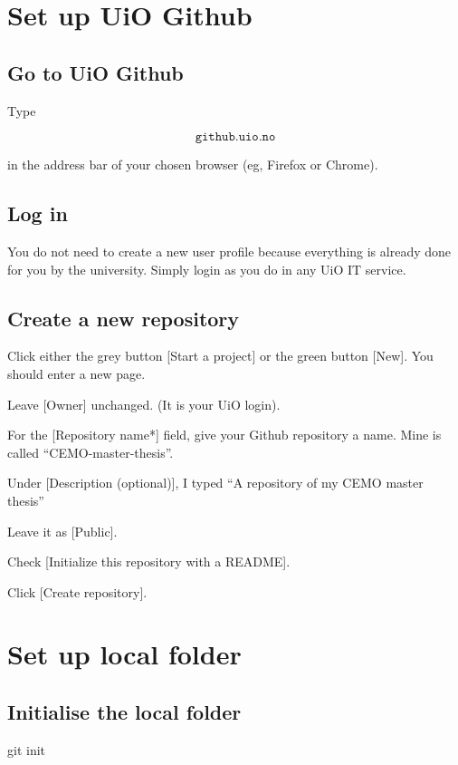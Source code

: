 \section{Set up UiO Github}

\subsection{Go to UiO Github}

Type

\[ \texttt{github.uio.no} \]

in the address bar of your chosen browser (eg, Firefox or Chrome).

\subsection{Log in}

You do not need to create a new user profile because everything is already done for you by the university. Simply login as you do in any UiO IT service.

\subsection{Create a new repository}

Click either the grey button [Start a project] or the green button [New]. You should enter a new page.

Leave [Owner] unchanged. (It is your UiO login).

For the [Repository name*] field, give your Github repository a name. Mine is called ``CEMO-master-thesis''.

Under [Description (optional)], I typed ``A repository of my CEMO master thesis''

Leave it as [Public].

Check [Initialize this repository with a README].

Click [Create repository].




\section{Set up local folder}

\subsection{Initialise the local folder}

git init

